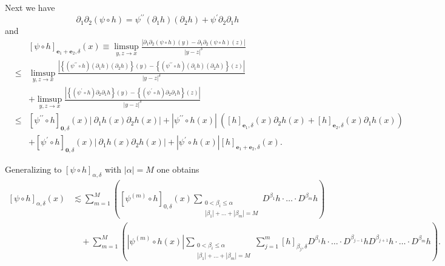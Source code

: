 \documentclass{amsart}
\theoremstyle{plain}
\numberwithin{equation}{section}
\begin{document}
Next we have%
\begin{equation*}
\partial _{1}\partial _{2}\left( \psi \circ h\right) =\psi ^{\prime \prime
}\left( \partial _{1}h\right) \left( \partial _{2}h\right) +\psi ^{\prime
}\partial _{2}\partial _{1}h
\end{equation*}%
and%
\begin{eqnarray*}
&&\left[ \psi \circ h\right] _{\mathbf{e}_{1}+\mathbf{e}_{2},\delta }\left(
x\right) \equiv \limsup_{y,z\rightarrow x}\frac{\left\vert \partial
_{1}\partial _{2}\left( \psi \circ h\right) \left( y\right) -\partial
_{1}\partial _{2}\left( \psi \circ h\right) \left( z\right) \right\vert }{
\left\vert y-z\right\vert ^{\delta }} \\
&\leq &\limsup_{y,z\rightarrow x}\frac{\left\vert \left\{ \left( \psi
^{\prime \prime }\circ h\right) \left( \partial _{1}h\right) \left( \partial
_{2}h\right) \right\} \left( y\right) -\left\{ \left( \psi ^{\prime \prime
}\circ h\right) \left( \partial _{1}h\right) \left( \partial _{2}h\right)
\right\} \left( z\right) \right\vert }{\left\vert y-z\right\vert ^{\delta }}
\\
&&+\limsup_{y,z\rightarrow x}\frac{\left\vert \left\{ \left( \psi ^{\prime
}\circ h\right) \partial _{2}\partial _{1}h\right\} \left( y\right) -\left\{
\left( \psi ^{\prime }\circ h\right) \partial _{2}\partial _{1}h\right\}
\left( z\right) \right\vert }{\left\vert y-z\right\vert ^{\delta }} \\
&\leq &\left[ \psi ^{\prime \prime }\circ h\right] _{\mathbf{0},\delta
}\left( x\right) \left\vert \ \partial _{1}h\left( x\right) \partial
_{2}h\left( x\right) \right\vert +\left\vert \psi ^{\prime \prime}\circ
h\left( x\right) \right\vert \ \left(\left[ h\right] _{\mathbf{e}_{1},\delta
}\left( x\right) \partial_{2}h\left( x\right) +\left[ h\right] _{\mathbf{e}
_{2},\delta }\left( x\right)\partial_{1}h\left( x\right) \right) \\
&&+\left[ \psi ^{\prime }\circ h\right] _{\mathbf{0},\delta }\left( x\right)
\left\vert \ \partial _{1}h\left( x\right) \partial _{2}h\left( x\right)
\right\vert+\left\vert \psi ^{\prime }\circ h\left( x\right) \right\vert %
\left[ h\right] _{\mathbf{e}_{1}+\mathbf{e}_{2},\delta }\left( x\right).
\end{eqnarray*}

Generalizing to $\left[ \psi \circ h\right] _{\alpha ,\delta }$ with $%
|\alpha |=M$ one obtains 
\begin{align*}
\left[ \psi \circ h\right] _{\alpha ,\delta }(x)& \lesssim
\sum_{m=1}^{M}\left( \left[ \psi ^{(m)}\circ h\right] _{0,\delta }(x)\sum 
_{\substack{ 0<\beta _{i}\leq \alpha  \\ |\beta _{1}|+\dots +|\beta _{m}|=M}}%
D^{\beta _{1}}h\cdot \dots \cdot D^{\beta _{m}}h\right) \\
& \quad +\sum_{m=1}^{M}\left( \left\vert \psi ^{(m)}\circ h(x)\right\vert
\sum_{\substack{ 0<\beta _{i}\leq \alpha  \\ |\beta _{1}|+\dots +|\beta
_{m}|=M}}\sum_{j=1}^{m}[h]_{\beta _{j},\delta }D^{\beta _{1}}h\cdot \dots
\cdot D^{\beta _{j-1}}hD^{\beta _{j+1}}h\cdot \dots \cdot D^{\beta
_{m}}h\right) .
\end{align*}
\end{document}
